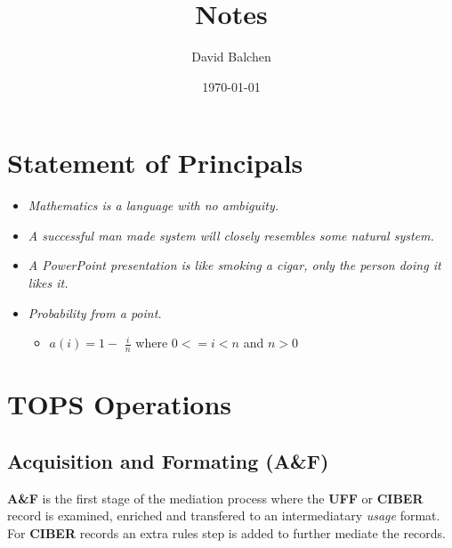 \documentclass[12pt,twoside]{article}
\author{David Balchen}
\date{\today}
\title{Notes}
\begin{document}
\maketitle
{}
\clearpage
\addtolength{\oddsidemargin}{0in}
\addtolength{\evensidemargin}{-01.25in}
\addtolength{\textwidth}{1.4in}
\addtolength{\topmargin}{-1.25in}
\addtolength{\textheight}{2.45in}
\setcounter{tocdepth}{3}
\vspace*{1cm} 
\newpage
{}
\setcounter{tocdepth}{2}
\pagestyle{fancy}
\fancyhf[C]{}
\setcounter{tocdepth}{2}
\tableofcontents
 \newpage
{}
\section{Statement of Principals}
\label{sec:orgheadline1}
\begin{itemize}
\item \emph{Mathematics is a language with no ambiguity.}
\item \emph{A successful man made system will closely resembles some natural system.}
\item \emph{A PowerPoint presentation is like smoking a cigar, only the
person doing it likes it.}
\item \emph{Probability from a point.}
\begin{itemize}
\item \(a(i) = 1-\) \Large \(\frac{i}{n}\) \normalsize where \(0 <= i < n\) and \(n > 0\)
\end{itemize}
\end{itemize}
\section{TOPS Operations}
\label{sec:orgheadline17}
\subsection{Acquisition and Formating (A\&F)}
\label{sec:orgheadline2}
\textbf{A\&F} is the first stage of the mediation process where the \textbf{UFF} or \textbf{CIBER} record is examined, enriched 
and transfered to an intermediatary \emph{usage} format. For \textbf{CIBER} records an extra rules step is 
added to further mediate the records.
\end{document}

